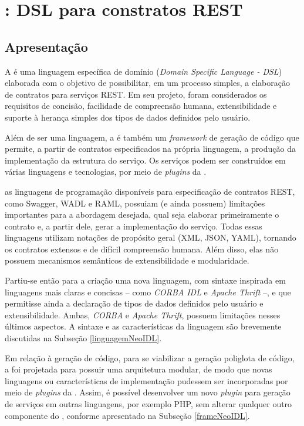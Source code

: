\section{\neoidl{}: DSL para constratos REST}

\subsection{Apresentação}

A \neoidl{} é uma linguagem específica de domínio (\textit{Domain Specific
Language - DSL}) elaborada com o objetivo de possibilitar, em um processo
simples, a elaboração de contratos para serviços REST. Em seu projeto, 
foram considerados os requisitos de concisão, facilidade de compreensão humana,
extensibilidade e suporte à herança simples dos tipos de dados definidos pelo
usuário.

Além de ser uma linguagem, a \neoidl{} é também um \textit{framework} de geração
de código que permite, a partir de contratos especificados na própria
linguagem, a produção da implementação da estrutura do serviço. Os serviços
podem ser construídos em várias linguagens e tecnologias, por meio
de \textit{plugins} da \neoidl{}.

as linguagens de programação disponíveis para especificação de
contratos REST, como Swagger\cite{swaggerSite}, WADL\cite{hadley2006web} e
RAML\cite{RAML}, possuiam (e ainda possuem) limitações importantes para a
abordagem desejada, qual seja elaborar primeiramente o contrato e, a
partir dele, gerar a implementação do serviço. Todas essas linguagens utilizam
notações de propósito geral (XML\cite{XML}, JSON\cite{JSon}, YAML\cite{YAML}),
tornando os contratos extensos e de difícil compreensão humana. Além disso,
elas não possuem mecanismos semânticos de extensibilidade e modularidade.

Partiu-se então para a criação uma nova linguagem, com sintaxe
inspirada em linguagens mais claras e concisas -- como \emph{CORBA
IDL}\texttrademark \cite{corba} e \emph{Apache
Thrift}\texttrademark\cite{thrift} --, e que permitisse ainda a declaração de
tipos de dados definidos pelo usuário e extensibilidade. Ambas, \emph{CORBA} e
\emph{Apache Thrift}, possuem limitações nesses últimos aspectos. A sintaxe e as
características da linguagem \neoidl{} são brevemente discutidas na Subseção
\ref{linguagemNeoIDL}.

Em relação à geração de código, para se viabilizar a geração poliglota de
código, a \neoidl{} foi projetada para possuir uma arquitetura modular, de modo
que novas linguagens ou características de implementação pudessem ser
incorporadas por meio de \textit{plugins} da \neoidl{}. Assim, é possível desenvolver um novo \textit{plugin} para geração de serviços em outras
linguagens, por exemplo PHP, sem alterar qualquer outro componente do \framework,
conforme apresentado na Subseção \ref{frameNeoIDL}.

